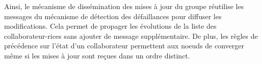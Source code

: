 Ainsi, le mécanisme de dissémination des mises à jour du groupe réutilise les messages du mécanisme de détection des défaillances pour diffuser les modifications.
Cela permet de propager les évolutions de la liste des collaborateur-rices sans ajouter de message supplémentaire.
De plus, les règles de précédence sur l'état d'un collaborateur permettent aux noeuds de converger même si les mises à jour sont reçues dans un ordre distinct.

